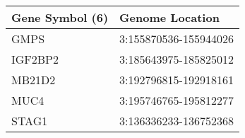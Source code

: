 \begin{tabular}{ll}
\toprule
Gene Symbol (6) &       Genome Location \\
\midrule
           GMPS & 3:155870536-155944026 \\
        IGF2BP2 & 3:185643975-185825012 \\
         MB21D2 & 3:192796815-192918161 \\
           MUC4 & 3:195746765-195812277 \\
          STAG1 & 3:136336233-136752368 \\
\bottomrule
\end{tabular}
